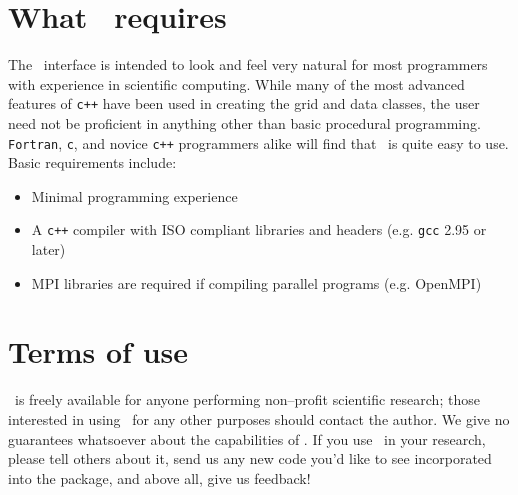 \section{What \MMSP\ requires}
The \MMSP\ interface is intended to look and feel very natural for most programmers with experience in scientific computing.  While many of the most advanced features of {\tt c++} have been used in creating the grid and data classes, the user need not be proficient in anything other than basic procedural programming.  {\tt Fortran}, {\tt c}, and novice {\tt c++} programmers alike will find that \MMSP\ is quite easy to use.  Basic requirements include:
\begin{itemize}
\item Minimal programming experience
\item A {\tt c++} compiler with ISO compliant libraries and headers (e.g. {\tt gcc} 2.95 or later)
\item MPI libraries are required if compiling parallel programs (e.g. OpenMPI)
\end{itemize}

\section{Terms of use}
\MMSP\ is freely available for anyone performing non--profit scientific research; those interested in using \MMSP\ for any other purposes should contact the author. We give no guarantees whatsoever about the capabilities of \MMSP. If you use \MMSP\ in your research, please tell others about it, send us any new code you'd like to see incorporated into the package, and above all, give us feedback! 

